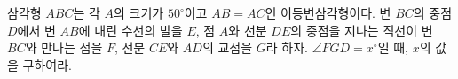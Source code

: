 
\numbering 삼각형 $ABC$는 각 $A$의 크기가 $50^\circ$이고 $AB = AC$인 이등변삼각형이다. 
변 $BC$의 중점 $D$에서 변 $AB$에 내린 수선의 발을 $E$, 
점 $A$와 선분 $DE$의 중점을 지나는 직선이 변 $BC$와 만나는 점을 $F$, 
선분 $CE$와 $AD$의 교점을 $G$라 하자. $\angle FGD = x^\circ$일 때, $x$의 값을 구하여라.\\
